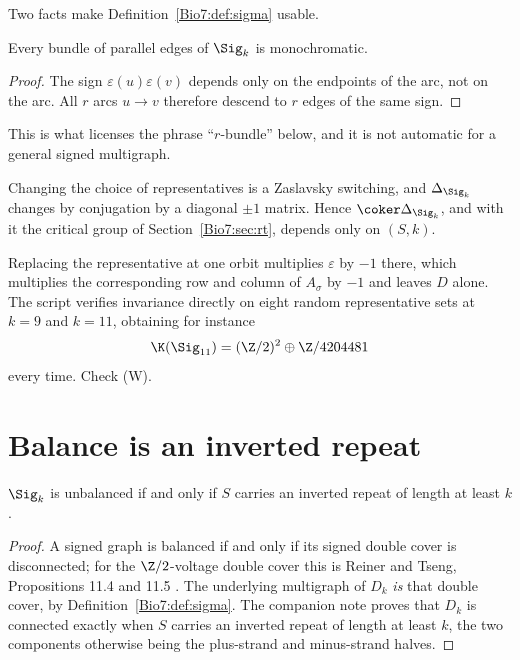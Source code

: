 Two facts make Definition~\ref{Bio7:def:sigma} usable.

\begin{lemma}\label{Bio7:lem:mono}
Every bundle of parallel edges of $\Sig_k$ is monochromatic.
\end{lemma}

\begin{proof}
The sign $\varepsilon(u)\varepsilon(v)$ depends only on the endpoints of the arc, not on the
arc. All $r$ arcs $u\to v$ therefore descend to $r$ edges of the same sign.
\end{proof}

This is what licenses the phrase ``$r$-bundle'' below, and it is not automatic for a general
signed multigraph.

\begin{lemma}\label{Bio7:lem:switch}
Changing the choice of representatives is a Zaslavsky switching, and
$\Delta_{\Sig_k}$ changes by conjugation by a diagonal $\pm1$ matrix. Hence $\coker
\Delta_{\Sig_k}$, and with it the critical group of Section~\ref{Bio7:sec:rt}, depends only on
$(S,k)$.
\end{lemma}

Replacing the representative at one orbit multiplies $\varepsilon$ by $-1$ there, which
multiplies the corresponding row and column of $A_\sigma$ by $-1$ and leaves $D$ alone. The
script verifies invariance directly on eight random representative sets at $k=9$ and $k=11$,
obtaining for instance
\[
  \K(\Sig_{11})=(\Z/2)^2\oplus\Z/4204481
\]
every time. Check (W).

\section{Balance is an inverted repeat}

\begin{theorem}\label{Bio7:thm:balance}
$\Sig_k$ is unbalanced if and only if $S$ carries an inverted repeat of length at least $k$.
\end{theorem}

\begin{proof}
A signed graph is balanced if and only if its signed double cover is disconnected; for the
$\Z/2$-voltage double cover this is Reiner and Tseng, Propositions 11.4 and 11.5
\cite{RT14}. The underlying multigraph of $D_k$ \emph{is} that double cover, by
Definition~\ref{Bio7:def:sigma}. The companion note proves that $D_k$ is connected exactly when
$S$ carries an inverted repeat of length at least $k$, the two components otherwise being
the plus-strand and minus-strand halves.
\end{proof}

